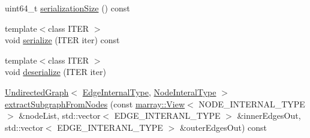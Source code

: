 \begin{DoxyCompactItemize}
\item 
uint64\+\_\+t \hyperlink{classnifty_1_1graph_1_1UndirectedGraph_a331afe7d6d0765cd71af8bf218d4cc36}{serialization\+Size} () const 
\item 
{\footnotesize template$<$class I\+T\+E\+R $>$ }\\void \hyperlink{classnifty_1_1graph_1_1UndirectedGraph_ad39b5a1269522c86a7c5469bbf9df2e1}{serialize} (I\+T\+E\+R iter) const 
\item 
{\footnotesize template$<$class I\+T\+E\+R $>$ }\\void \hyperlink{classnifty_1_1graph_1_1UndirectedGraph_ad64103a26a487c730d69e7daaef38191}{deserialize} (I\+T\+E\+R iter)
\item 
\hyperlink{classnifty_1_1graph_1_1UndirectedGraph}{Undirected\+Graph}$<$ \hyperlink{classnifty_1_1graph_1_1UndirectedGraph_a70e38582c25deca5e0ce080277cb30fc}{Edge\+Internal\+Type}, \hyperlink{classnifty_1_1graph_1_1UndirectedGraph_aa3b43dd44281416b7232caae529e8780}{Node\+Interal\+Type} $>$ \hyperlink{classnifty_1_1graph_1_1UndirectedGraph_a124a705edb8f41f7f2672443fcfb1051}{extract\+Subgraph\+From\+Nodes} (const \hyperlink{classandres_1_1View}{marray\+::\+View}$<$ N\+O\+D\+E\+\_\+\+I\+N\+T\+E\+R\+N\+A\+L\+\_\+\+T\+Y\+P\+E $>$ \&node\+List, std\+::vector$<$ E\+D\+G\+E\+\_\+\+I\+N\+T\+E\+R\+A\+N\+L\+\_\+\+T\+Y\+P\+E $>$ \&inner\+Edges\+Out, std\+::vector$<$ E\+D\+G\+E\+\_\+\+I\+N\+T\+E\+R\+A\+N\+L\+\_\+\+T\+Y\+P\+E $>$ \&outer\+Edges\+Out) const 
\end{DoxyCompactItemize}
